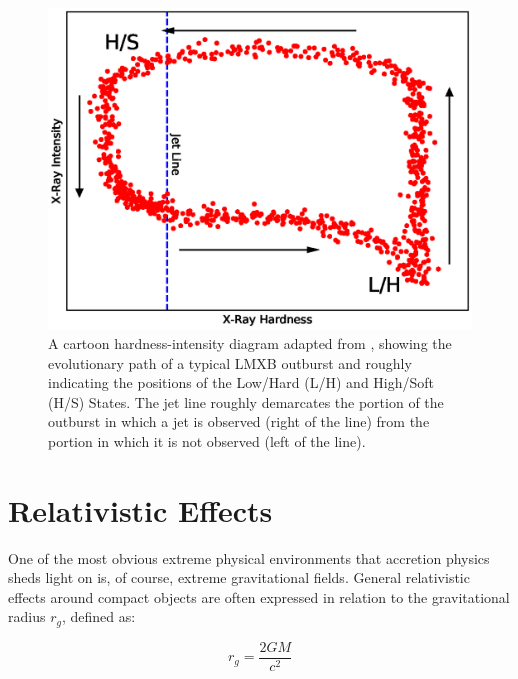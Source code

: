 \begin{figure}
   \centering
    \includegraphics[width=\columnwidth, trim = 0mm 0mm 0mm 0mm, clip]{images/Fender_D.eps}
    \captionsetup{singlelinecheck=off}
    \caption{A cartoon hardness-intensity diagram adapted from \citet{Fender_UniJets}, showing the evolutionary path of a typical LMXB outburst and roughly indicating the positions of the Low/Hard (L/H) and High/Soft (H/S) States.  The jet line roughly demarcates the portion of the outburst in which a jet is observed (right of the line) from the portion in which it is not observed (left of the line).}
   \label{fig:Fender}
\end{figure}

\section{Relativistic Effects}

\par One of the most obvious extreme physical environments that accretion physics sheds light on is, of course, extreme gravitational fields.  General relativistic effects around compact objects are often expressed in relation to the gravitational radius $r_g$, defined as:

\begin{equation}
r_g=\frac{2GM}{c^2}
\end{equation}

